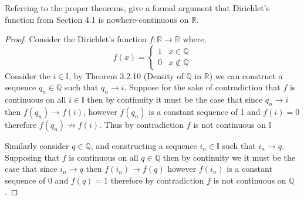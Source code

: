 \documentclass[12pt]{article}
\makeatletter
\theoremstyle{homework}
\newenvironment{exercise}[1]
{\def\@currentlabel{#1}\exercisecore}
{\endexercisecore}
\newcommand{\Reals}{\ensuremath{\mathbb R}}
\newcommand{\Rats}{\ensuremath{\mathbb Q}}
\newcommand{\Irats}{\ensuremath{\mathbb I}}
\makeatother
\begin{document}
\begin{exercise}{Abbott 4.3.7(a)}Referring to the proper theorems, 
give a formal argument that Dirichlet’s function from Section 4.1 is nowhere-continuous on $\Reals$.\\

\begin{proof}
  Consider the Dirichlet’s function $f: \Reals \to \Reals$ where,
  \begin{equation*}
    f(x) = 
    \begin{cases} 
      1 & x \in \Rats \\
      0 & x \notin \Rats 
   \end{cases}
  \end{equation*}
  Consider the $i \in \Irats$, by Theorem 3.2.10 (Density of $\Rats$ in $\Reals$) we can construct a sequence
  $q_n \in \Rats$ such that $q_n \to i$. Suppose for the sake of contradiction that $f$ is continuous on all $i \in \Irats$ then
  by continuity it must be the case that since $q_n \to i$ then $f(q_n) \to f(i)$, however $f(q_n)$ is a constant sequence of 1 and $f(i) = 0$ therefore $f(q_n) \not\to f(i)$. Thus by contradiction $f$ is not continuous on $\Irats$

Similarly consider $q \in \Rats$, and constructing a sequence $i_n \in \Irats$ such that $i_n \to q$. Supposing that $f$ is continuous on all $q \in \Rats$ then by continuity
we it must be the case that since $i_n \to q$ then $f(i_n) \to f(q)$ however $f(i_n)$ is a constant sequence of 0 and $f(q) = 1$ therefore by contradiction $f$ is not continuous on $\Rats$.
\end{proof}
\end{exercise}
\vspace{.5in}
\end{document}
